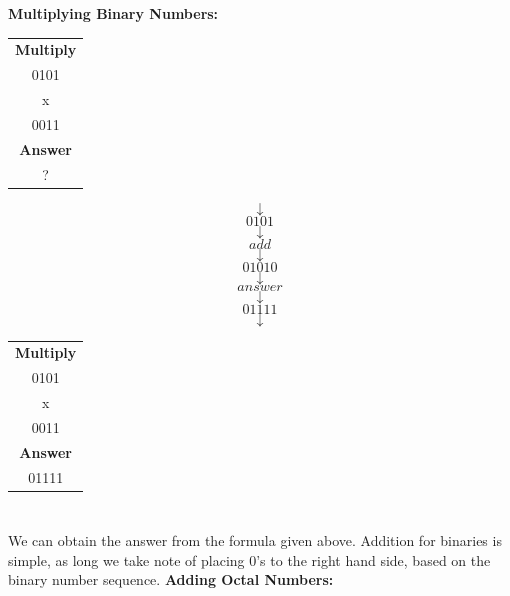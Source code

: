 \documentclass{article}
\begin{document}
\newpage
\textbf{Multiplying Binary Numbers:}
\newline
\newline
\begin{table}[h!]
    \centering
    \begin{tabular}{|c|}
    \hline
        \textbf{Multiply} \\
        0101  \\
        x  \\
        0011   \\
        \hline
               \textbf{Answer} \\
        ?  \\ 
        \hline
    \end{tabular}
    \label{tab:my_label}
\end{table}
$$\downarrow$$
$$0101$$
$$\downarrow$$
$$add$$
$$\downarrow$$
$$01010$$
$$\downarrow$$
$$answer$$
$$\downarrow$$
$$01111$$
$$\downarrow$$
\begin{table}[h!]
    \centering
    \begin{tabular}{|c|}
    \hline
        \textbf{Multiply} \\
        0101  \\
        x  \\
        0011   \\
        \hline
               \textbf{Answer} \\
        01111  \\ 
        \hline
    \end{tabular}
    \label{tab:my_label}
\end{table}
\section*{}
We can obtain the answer from the formula given above. Addition for binaries is simple, as long we take note of placing 0's to the right hand side, based on the binary number sequence.
\newpage
\textbf{Adding Octal Numbers:}
\subsection*{}
\end{document}
